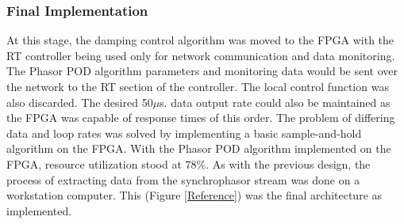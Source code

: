 \documentclass[conference]{IEEEtran}
\begin{document}
\subsubsection{Final Implementation}

At this stage, the damping control algorithm was moved to the FPGA with the RT controller being used only for network communication and data monitoring. The  Phasor POD algorithm parameters and monitoring data would be sent over the network to the RT section of the controller. The local control function was also discarded. The desired 50$\mu$s. data output rate could also be maintained as the FPGA was capable of response times of this order. The problem of differing data and loop rates was solved by implementing a basic sample-and-hold algorithm on the FPGA. With the Phasor POD algorithm implemented on the FPGA, resource utilization stood at 78\%. As with the previous design, the process of extracting data from the synchrophasor stream was done on a workstation computer. This (Figure \ref{Reference}) was the final architecture as implemented. %
\end{document}
